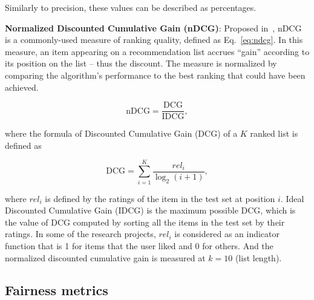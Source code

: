         Similarly to precision, these values can be described as percentages.
        
        \textbf{Normalized Discounted Cumulative Gain (nDCG)}: Proposed in~\cite{jarvelin2002cumulated}, nDCG is a commonly-used measure of ranking quality, defined as Eq.~\eqref{eq:ndcg}. In this measure, an item appearing on a recommendation list accrues ``gain'' according to its position on the list -- thus the discount. The measure is normalized by comparing the algorithm's performance to the best ranking that could have been achieved. 

        \begin{equation}
        \text{nDCG}=\frac{\text{DCG}}{\text{IDCG}},
        \label{eq:ndcg}
        \end{equation}
        
        where the formula of Discounted Cumulative Gain (DCG) of a $K$ ranked list is defined as
        
        \begin{equation}
        \text{DCG}=\sum_{i=1}^K\frac{{rel}_i}{\log_2(i+1)},
        \end{equation}
        
        where ${rel}_i$ is defined by the ratings of the item in the test set at position $i$. Ideal Discounted Cumulative Gain (IDCG) is the maximum possible DCG, which is the value of DCG computed by sorting all the items in the test set by their ratings.
        In some of the research projects, ${rel}_i$ is considered as an indicator function that is 1 for items that the user liked and 0 for others. And the normalized discounted cumulative gain is measured at $k=10$ (list length).
        
    \subsection{Fairness metrics}
    
        
        
